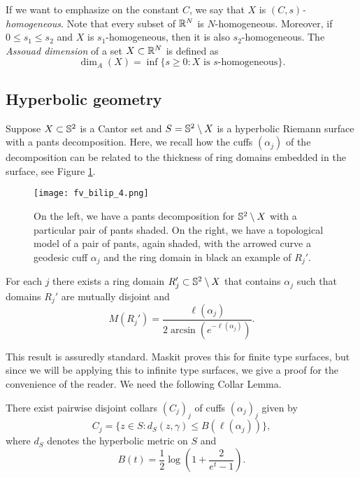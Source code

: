 \documentclass{amsart}
\begin{document}
If we want to emphasize on the constant $C$, we say that $X$ is \emph{$(C,s)$-homogeneous}. Note that every subset of $\R^N$ is $N$-homogeneous. Moreover, if $0\leq s_1\leq s_2$ and $X$ is $s_1$-homogeneous, then it is also $s_2$-homogeneous. %
The \emph{Assouad dimension} of a set $X \subset \R^N$ is defined as
\[ \dim_A(X) = \inf\{s \geq 0 : X\text{ is $s$-homogeneous}\}.\]


\subsection{Hyperbolic geometry}

Suppose $X\subset\S^2$ is a Cantor set and $S=\S^2 \setminus X$ is a hyperbolic Riemann surface with a pants decomposition. Here, we recall how the cuffs $(\alpha_j)$ of the decomposition can be related to the thickness of ring domains embedded in the surface, see Figure \ref{fig:3}.

\begin{figure}[h]
\begin{center}
\texttt{[image: fv\_bilip\_4.png]}
\caption{On the left, we have a pants decomposition for $\S^2 \setminus X$ with a particular pair of pants shaded. On the right, we have a topological model of a pair of pants, again shaded, with the arrowed curve a geodesic cuff $\alpha_j$ and the ring domain in black an example of $R_j'$.}
\label{fig:3}
\end{center}
\end{figure}

\begin{proposition}\label{prop:collar}
For each $j$ there exists a ring domain $R_j' \subset \S^2\setminus X$ that contains $\alpha_j$ such that domains $R_j'$ are mutually disjoint and
\[ M(R_j') =  \frac{\ell(\alpha_j)}{2\arcsin ( e^{-\ell(\alpha_j)} )} .\]
\end{proposition}

This result is assuredly standard. Maskit \cite{Ma85} proves this for finite type surfaces, but since we will be applying this to infinite type surfaces, we give a proof for the convenience of the reader. We need the following Collar Lemma. 

\begin{lemma}\label{lem:collar}
There exist pairwise disjoint collars $(C_j)_j$ of cuffs $(\alpha_j)_j$
given by
\[ C_j = \{ z\in S : d_S(z, \gamma)  \leq B(\ell(\alpha_j)) \}, \]
where $d_S$ denotes the hyperbolic metric on $S$ and 
\[ B(t) = \frac{1}{2} \log \left ( 1 + \frac{2}{e^t-1} \right ).\]
\end{lemma}
\end{document}
